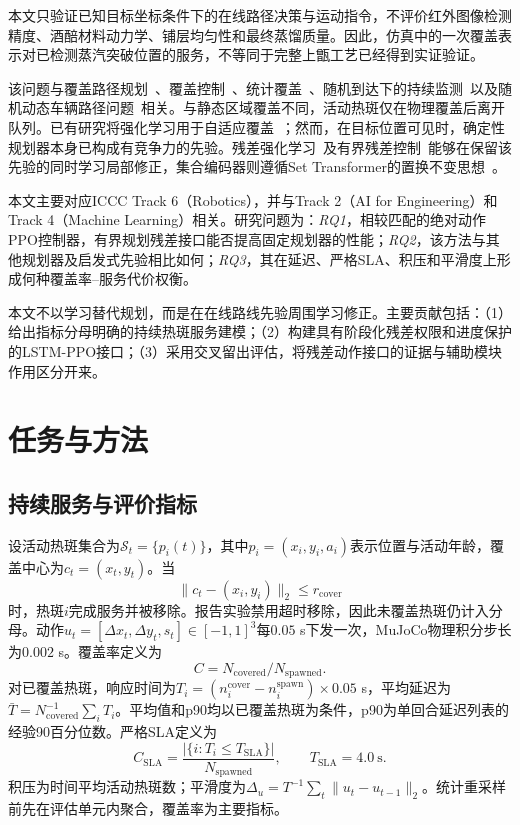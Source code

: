 \documentclass[conference]{IEEEtran}
\begin{document}
本文只验证已知目标坐标条件下的在线路径决策与运动指令，不评价红外图像检测精度、酒醅材料动力学、铺层均匀性和最终蒸馏质量。因此，仿真中的一次覆盖表示对已检测蒸汽突破位置的服务，不等同于完整上甑工艺已经得到实证验证。

该问题与覆盖路径规划~\cite{galceran2013survey}、覆盖控制~\cite{cortes2004coverage}、统计覆盖~\cite{arslan2019statistical}、随机到达下的持续监测~\cite{yu2015persistent}以及随机动态车辆路径问题~\cite{bertsimas1991stochastic,bertsimas1993multiple}相关。与静态区域覆盖不同，活动热斑仅在物理覆盖后离开队列。已有研究将强化学习用于自适应覆盖~\cite{carvalho2025zeroshot,champagnie2024online}；然而，在目标位置可见时，确定性规划器本身已构成有竞争力的先验。残差强化学习~\cite{johannink2019residual}及有界残差控制~\cite{yan2025ictrl,zhang2023robodact}能够在保留该先验的同时学习局部修正，集合编码器则遵循Set Transformer的置换不变思想~\cite{lee2019settransformer}。

本文主要对应ICCC Track 6（Robotics），并与Track 2（AI for Engineering）和Track 4（Machine Learning）相关。研究问题为：\emph{RQ1}，相较匹配的绝对动作PPO控制器，有界规划残差接口能否提高固定规划器的性能；\emph{RQ2}，该方法与其他规划器及启发式先验相比如何；\emph{RQ3}，其在延迟、严格SLA、积压和平滑度上形成何种覆盖率--服务代价权衡。

本文不以学习替代规划，而是在在线路线先验周围学习修正。主要贡献包括：（1）给出指标分母明确的持续热斑服务建模；（2）构建具有阶段化残差权限和进度保护的LSTM-PPO接口；（3）采用交叉留出评估，将残差动作接口的证据与辅助模块作用区分开来。

\section{任务与方法}
\subsection{持续服务与评价指标}
设活动热斑集合为$\mathcal S_t=\{p_i(t)\}$，其中$p_i=(x_i,y_i,a_i)$表示位置与活动年龄，覆盖中心为$c_t=(x_t,y_t)$。当
\begin{equation}
\|c_t-(x_i,y_i)\|_2\le r_{\mathrm{cover}}
\end{equation}
时，热斑$i$完成服务并被移除。报告实验禁用超时移除，因此未覆盖热斑仍计入分母。动作$u_t=[\Delta x_t,\Delta y_t,s_t]\in[-1,1]^3$每$0.05$ s下发一次，MuJoCo物理积分步长为$0.002$ s。覆盖率定义为
\begin{equation}
C=N_{\mathrm{covered}}/N_{\mathrm{spawned}}.
\end{equation}
对已覆盖热斑，响应时间为$T_i=(n_i^{\mathrm{cover}}-n_i^{\mathrm{spawn}})\times0.05$ s，平均延迟为$\bar T=N_{\mathrm{covered}}^{-1}\sum_iT_i$。平均值和p90均以已覆盖热斑为条件，p90为单回合延迟列表的经验90百分位数。严格SLA定义为
\begin{equation}
C_{\mathrm{SLA}}=\frac{|\{i:T_i\le T_{\mathrm{SLA}}\}|}{N_{\mathrm{spawned}}},
\qquad T_{\mathrm{SLA}}=4.0\ \mathrm{s}.
\end{equation}
积压为时间平均活动热斑数；平滑度为$\Delta_u=T^{-1}\sum_t\|u_t-u_{t-1}\|_2$。统计重采样前先在评估单元内聚合，覆盖率为主要指标。
\end{document}
